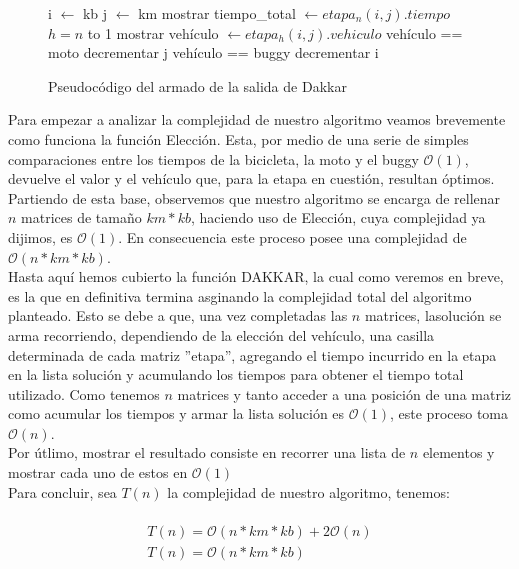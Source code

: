 \begin{figure}[!ht]
\begin{codebox}
\li i $\leftarrow$ kb
\li j $\leftarrow$ km
\li mostrar tiempo_total $\leftarrow etapa_n(i,j).tiempo$
\li \For $h = n$ to 1
\li 		\Do 
			mostrar vehículo $\leftarrow etapa_h(i,j).vehiculo$
\li			\If vehículo == moto
\li				\Do decrementar j
\li 			\Else \If vehículo == buggy
\li					\Do decrementar i
					\End
			\End
		\End
\end{codebox} 
\caption{Pseudocódigo del armado de la salida de Dakkar}\label{code:dakkar.salida}
\end{figure}

Para empezar a analizar la complejidad de nuestro algoritmo veamos brevemente como funciona la función {\sc Elección}. Esta, por medio de una serie de simples comparaciones entre los tiempos de la bicicleta, la moto y el buggy $\mathcal{O}(1)$, devuelve el valor y el vehículo que, para la etapa en cuestión, resultan óptimos.\\
Partiendo de esta base, observemos que nuestro algoritmo se encarga de rellenar $n$ matrices de tamaño $km*kb$, haciendo uso de {\sc Elección}, cuya complejidad ya dijimos, es $\mathcal{O}(1)$. En consecuencia este proceso posee una complejidad de $\mathcal{O}(n*km*kb)$.\\
Hasta aquí hemos cubierto la función DAKKAR, la cual como veremos en breve, es la que en definitiva termina asginando la complejidad total del algoritmo planteado. Esto se debe a que, una vez completadas las $n$ matrices, lasolución se arma recorriendo, dependiendo de la elección del vehículo, una casilla determinada de cada matriz ''etapa'', agregando el tiempo incurrido en la etapa en la lista solución y acumulando los tiempos para obtener el tiempo total utilizado. Como tenemos $n$ matrices y tanto acceder a una posición de una matriz como acumular los tiempos y armar la lista solución es $\mathcal{O}(1)$, este proceso toma $\mathcal{O}(n)$.\\
Por útlimo, mostrar el resultado consiste en recorrer una lista de $n$ elementos y mostrar cada uno de estos en $\mathcal{O}(1)$\\
Para concluir, sea $T(n)$ la complejidad de nuestro algoritmo, tenemos:\\
\\
\begin{equation*}
\begin{array}{l}
T(n) = \mathcal{O}(n*km*kb) + 2\mathcal{O}(n)\\
T(n) = \mathcal{O}(n*km*kb)
\end{array}
\end{equation*}



